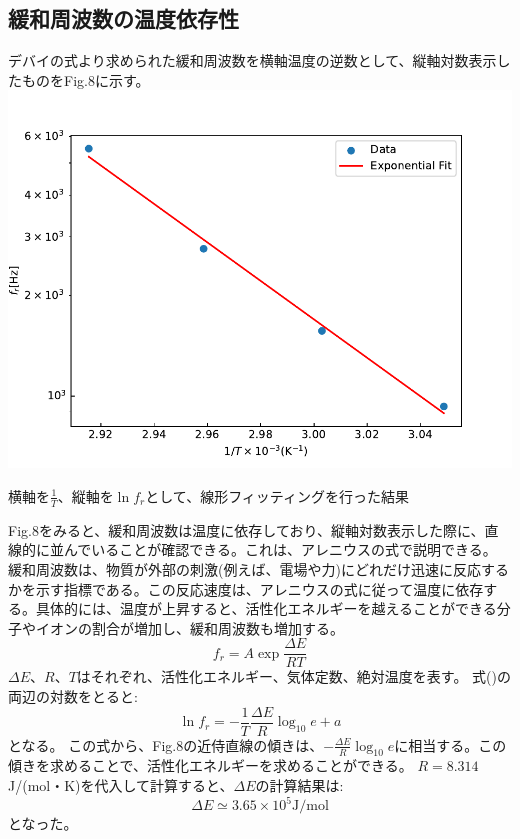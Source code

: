 \documentclass[a4paper,10pt]{jsarticle}
\makeatletter
\newenvironment{figurehere}
{\def\@captype{figure}}
{}
\makeatother
\begin{document}
\begin{multicols}{2}
\subsection{\textrm{緩和周波数の温度依存性}}
デバイの式より求められた緩和周波数を横軸温度の逆数として、縦軸対数表示したものをFig.8に示す。
\begin{figurehere}
\centering
\includegraphics[width=1\linewidth]{fig/areniusu.pdf}
\caption{横軸を$\frac{1}{T}$、縦軸を$\ln{f_r}$として、線形フィッティングを行った結果}
\label{fig:fit_55}
\end{figurehere}

  
Fig.8をみると、緩和周波数は温度に依存しており、縦軸対数表示した際に、直線的に並んでいることが確認できる。これは、アレニウスの式で説明できる。
緩和周波数は、物質が外部の刺激(例えば、電場や力)にどれだけ迅速に反応するかを示す指標である。この反応速度は、アレニウスの式に従って温度に依存する。具体的には、温度が上昇すると、活性化エネルギーを越えることができる分子やイオンの割合が増加し、緩和周波数も増加する。
\begin{equation}
  f_r = A\exp{\frac{\Delta E}{RT}}
\end{equation}
$\Delta E$、$R$、$T$はそれぞれ、活性化エネルギー、気体定数、絶対温度を表す。
式()の両辺の対数をとると:
\begin{equation}
  \ln{f_r} = -\frac{1}{T}\frac{\Delta E}{R}\log_{10}{e} + a
\end{equation}
となる。
この式から、Fig.8の近侍直線の傾きは、$-\frac{\Delta E}{R}\log_{10}{e}$に相当する。この傾きを求めることで、活性化エネルギーを求めることができる。
$R=8.314$J/(mol・K)を代入して計算すると、$\Delta E$の計算結果は:
\begin{equation}
  \Delta E \simeq 3.65 \times 10^5  \text{J/mol}
\end{equation}
となった。

\end{multicols}
\end{document}
